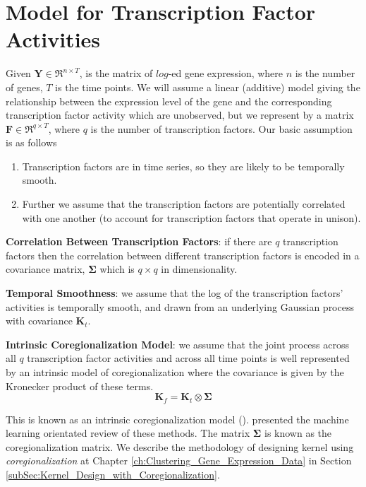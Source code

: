\section{Model for Transcription Factor Activities}\label{sec:Model_for_TFA}
Given $\mathbf{Y} \in \Re^{n\times T}$, is the matrix of $log$-ed gene expression, where $n$ is the number of genes, $T$ is the time points. We will assume a linear (additive) model giving the relationship between the expression level of the gene and the corresponding transcription factor activity which are unobserved, but we represent by a matrix $\mathbf{F} \in \Re^{q\times T}$, where $q$ is the number of transcription factors. Our basic assumption is as follows
\begin{enumerate}
 \item Transcription factors are in time series, so they are likely to be temporally smooth. 
 \item Further we assume that the transcription factors are potentially correlated with one another (to account for transcription factors that operate in unison).
\end{enumerate}

\textbf{Correlation Between Transcription Factors}: if there are $q$ transcription factors then the correlation between different transcription factors is encoded in a covariance matrix, $\boldsymbol{\Sigma}$ which is $q\times q$ in dimensionality. 

\textbf{Temporal Smoothness}: we assume that the log of the transcription factors' activities is temporally smooth, and drawn from an underlying Gaussian process with covariance $\mathbf{K}_t$. 

\textbf{Intrinsic Coregionalization Model}: we assume that the joint process across all $q$ transcription factor activities and across all time points is well represented by an intrinsic model of coregionalization where the covariance is given by the Kronecker product of these terms.
\begin{equation} \label{eq:K_intrinsic_coregionalization}
  \mathbf{K}_f = \mathbf{K}_t \otimes \boldsymbol{\Sigma}
\end{equation}

This is known as an intrinsic coregionalization model (\cite{Wackernagel:2003}). \cite{Alvarez:2012} presented the machine learning orientated review of these methods. The matrix $\boldsymbol{\Sigma}$ is known as the coregionalization matrix. We describe the methodology of designing kernel using \emph{coregionalization} at Chapter \ref{ch:Clustering_Gene_Expression_Data} in Section \ref{subSec:Kernel_Design_with_Coregionalization}.

